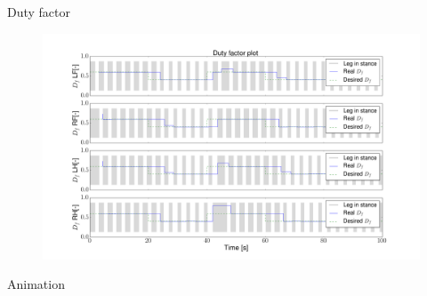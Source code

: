 \documentclass{beamer}
\begin{document}
\begin{frame}{Duty factor}
\vspace{-1cm}
	\begin{figure}[ht]\centering
		\includegraphics[width=1.1\textwidth]{images/DutyFactor.png}
	\end{figure}\vspace{-20pt}
\end{frame}

\begin{frame}{Animation}

\begin{center}
         \\
\end{center}

\end{frame}
\end{document}
